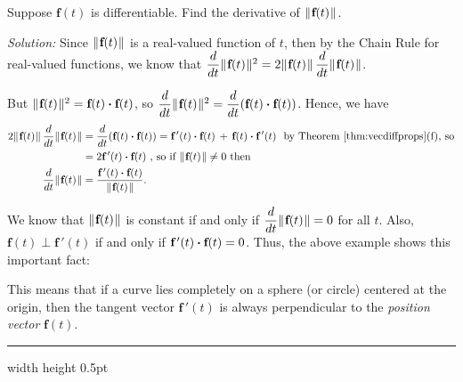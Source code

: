\begin{exmp}\label{exmp:absvecderiv}
 Suppose $\textbf{f}(t)$ is differentiable. Find the derivative of $\lVert\mspace{1mu}\textbf{f}(t)\mspace{1mu}\rVert$.\vspace{1mm}
 \par\noindent \emph{Solution:} Since $\lVert\mspace{1mu}\textbf{f}(t)\mspace{1mu}\rVert$ is a real-valued function of $t$, then by the Chain
 Rule for real-valued functions, we know that
  $\dfrac{d}{dt} \lVert\mspace{1mu}\textbf{f}(t)\mspace{1mu}\rVert^2 = 2 \lVert\mspace{1mu}\textbf{f}(t)\mspace{1mu}\rVert \, \dfrac{d}{dt} \lVert\mspace{1mu}\textbf{f}(t)\mspace{1mu}\rVert$.

 \par\noindent But $\lVert\mspace{1mu}\textbf{f}(t)\mspace{1mu}\rVert^2 = \textbf{f}(t) \bm{\cdot} \textbf{f}(t)$, so
 $\dfrac{d}{dt} \lVert\mspace{1mu}\textbf{f}(t)\mspace{1mu}\rVert^2 = \dfrac{d}{dt} ( \textbf{f}(t) \bm{\cdot} \textbf{f}(t) )$.
 Hence, we have
 \begin{align*}
  2 \lVert\mspace{1mu}\textbf{f}(t)\mspace{1mu}\rVert\,\dfrac{d}{dt} \lVert\mspace{1mu}\textbf{f}(t)\mspace{1mu}\rVert &= \dfrac{d}{dt} (\textbf{f}(t) \bm{\cdot} \textbf{f}(t))
  = \textbf{f}\,'(t) \bm{\cdot} \textbf{f}(t) \, + \, \textbf{f}(t) \bm{\cdot} \textbf{f}\,'(t)
   \text{~~by Theorem \ref{thm:vecdiffprops}(f), so}\\
  &= 2 \textbf{f}\,'(t) \bm{\cdot} \textbf{f}(t) \text{~,~so if $\lVert\mspace{1mu}\textbf{f}(t)\mspace{1mu}\rVert \ne 0$ then}\\
  \dfrac{d}{dt} \lVert\mspace{1mu}\textbf{f}(t)\mspace{1mu}\rVert &= \dfrac{\textbf{f}\,'(t) \bm{\cdot} \textbf{f}(t)}{\lVert\mspace{1mu}\textbf{f}(t)\mspace{1mu}\rVert} .
 \end{align*}

We know that $\lVert\mspace{1mu}\textbf{f}(t)\mspace{1mu}\rVert$ is constant if and only if $\dfrac{d}{dt} \lVert\mspace{1mu}\textbf{f}(t)\mspace{1mu}\rVert = 0$ for all $t$.
Also, $\textbf{f}(t) \perp \textbf{f}\,'(t)$ if and only if $\textbf{f}\,'(t) \bm{\cdot} \textbf{f}(t) = 0$. Thus, the
above example shows this important fact:
\begin{center}\end{center}
This means that if a curve lies completely on a sphere (or circle) centered at the origin, then the tangent vector
$\textbf{f}\,'(t)$ is always perpendicular to the \emph{position vector} $\textbf{f}(t)$.
\end{exmp}
\hrule width \textwidth height 0.5pt
